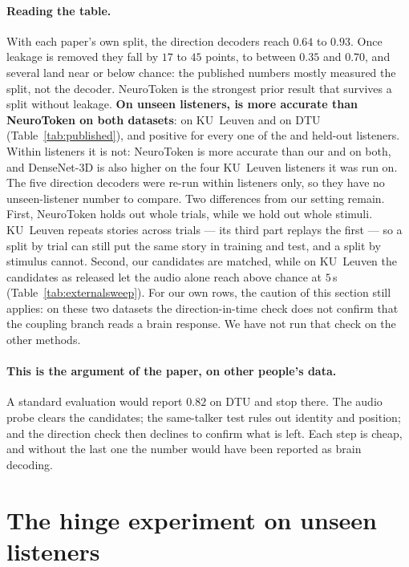 \paragraph{Reading the table.}
With each paper's own split, the direction decoders reach $0.64$ to $0.93$. Once
leakage is removed they fall by $17$ to $45$ points, to between $0.35$ and $0.70$,
and several land near or below chance: the published numbers mostly measured the
split, not the decoder. NeuroToken is the strongest prior result that survives a
split without leakage. \textbf{On unseen listeners, \merit{} is more accurate than
NeuroToken on both datasets}:  on
KU~Leuven and  on DTU
(Table~\ref{tab:published}), and positive for every one of the
 and 
held-out listeners. Within listeners it is not: NeuroToken is more accurate than
our  and
 on both, and DenseNet-3D is also higher
on the four KU~Leuven listeners it was run on. The five direction decoders were re-run within
listeners only, so they have no unseen-listener number to compare. Two differences from our setting remain. First, NeuroToken holds
out whole trials, while we hold out whole stimuli. KU~Leuven repeats stories across
trials --- its third part replays the first --- so a split by trial can still put
the same story in training and test, and a split by stimulus cannot. Second, our
candidates are matched, while on KU~Leuven the candidates as released let the audio
alone reach  above chance at $5$\,s
(Table~\ref{tab:externalsweep}). For our own rows, the caution of this section still
applies: on these two datasets the direction-in-time check does not confirm that
the coupling branch reads a brain response. We have not run that check on the
other methods.

\paragraph{This is the argument of the paper, on other people's data.}
A standard evaluation would report $0.82$ on DTU and stop there. The audio probe
clears the candidates; the same-talker test rules out identity and position; and
the direction check then declines to confirm what is left. Each step is cheap, and
without the last one the number would have been reported as brain decoding.

\section{The hinge experiment on unseen listeners}
\label{app:hinge2loso}


